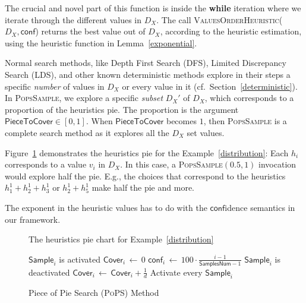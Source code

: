 \documentclass{ws-ijait}
\begin{document}
The crucial and novel part of this function is inside the \textbf{while} iteration where we iterate through the different values in $D_X$. The call \textsc{ValuesOrderHeuristic}($D_X, \mathsf{conf}$) returns the best value out of $D_X$, according to the heuristic estimation, using the heuristic function in Lemma~\ref{exponential}.

Normal search methods, like Depth First Search (DFS), %
Limited Discrepancy Search (LDS), and other known deterministic methods explore in their steps a specific \emph{number} of values in $D_X$ or every value in it (cf.\ Section~\ref{deterministic}). In \textsc{PopsSample}, we explore a specific \emph{subset} $D_X'$ of $D_X$, which corresponds to a proportion of the heuristics pie. The proportion is the argument $\mathsf{PieceToCover} \in [0,1]$. When $\mathsf{PieceToCover}$ becomes $1$, then \textsc{PopsSample} is a complete search method as it explores all the $D_X$ set values.
\begin{example}
Figure~\ref{piechart} demonstrates the heuristics pie for the Example~\ref{distribution}: Each $h_i$ corresponds to a value $v_i$ in $D_X$. In this case, a \textsc{PopsSample}$(0.5,1)$ invocation would explore half the pie. E.g., the choices that correspond to the heuristics $h_1^1 + h_2^1 + h_3^1$ or $h_2^1 + h_5^1$ make half the pie and more.
\end{example}
The exponent in the heuristic values has to do with the $\mathsf{conf}$idence semantics in our framework.

\begin{figure}
  \centering
  
  \caption{The heuristics pie chart for Example~\ref{distribution}\label{piechart}}
\end{figure}

\begin{figure}
\centering
\begin{algorithmic}
                \State  $\mathsf{Sample}_i$ is activated
                \State  $\mathsf{Cover}_i \, \gets \, 0$
                \State  $\mathsf{conf}_i  \, \gets \, 100 \cdot \frac{i-1}{\mathsf{SamplesNum}-1}$
        \EndFor
                                \State  $\mathsf{Sample}_i$ is deactivated
                        \EndIf
                        \State  $\mathsf{Cover}_i \, \gets \, \mathsf{Cover}_i + \frac{1}{d}$
                \EndFor
                        \State  Activate every $\mathsf{Sample}_i$
                \EndIf
        \EndWhile
\EndFunction
\end{algorithmic}
\caption{Piece of Pie Search ({\normalfont\textsc{PoPS}}) Method\label{pops}}
\end{figure}
\end{document}
